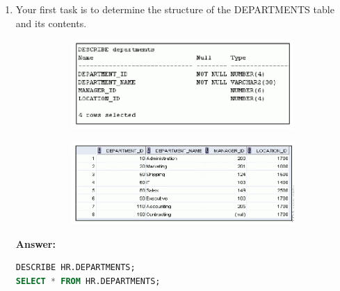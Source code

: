 \documentclass[a4paper,12pt]{article}
\begin{document}
\begin{enumerate}[start=4]
    \item Your first task is to determine the structure of the DEPARTMENTS table and its contents.
    \begin{figure}[h]
        \centering
        \begin{subfigure}[b]{0.45\linewidth}
            \centering
            \includegraphics[width=\linewidth]{graphics/4.1.png}
        \end{subfigure}
        \hspace{1em} %
        \begin{subfigure}[b]{0.45\linewidth}
            \centering
            \includegraphics[width=\linewidth]{graphics/4.2.png}
        \end{subfigure}
    \end{figure}
    
    \textbf{Answer: }
    \begin{lstlisting}[language=SQL]
DESCRIBE HR.DEPARTMENTS;
SELECT * FROM HR.DEPARTMENTS;
    \end{lstlisting}
    

\end{enumerate}
\end{document}
